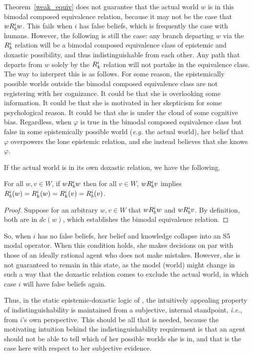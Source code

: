 Theorem~\ref{weak_equiv} does not guarantee that the actual world $w$ is in this bimodal composed equivalence relation, because it may not be the case that $wR_{b}^iw$. This fails when $i$ has false beliefs, which is frequently the case with humans. However, the following is still the case: any branch departing $w$ via the $R_{b}^i$ relation will be a bimodal composed equivalence class of epistemic and doxastic possibility, and thus indistinguishable from each other. Any path that departs from $w$ solely by the $R_{k}^i$ relation will not partake in the equivalence class. The way to interpret this is as follows. For some reason, the epistemically possible worlds outside the bimodal composed equivalence class are not registering with her cognizance. It could be that she is overlooking some information. It could be that she is motivated in her skepticism for some psychological reason. It could be that she is under the cloud of some cognitive bias. Regardless, when $\varphi$ is true in the bimodal composed equivalence class but false in some epistemically possible world (\emph{e.g.} the actual world), her belief that $\varphi$ overpowers the lone epistemic relation, and she instead believes that she knows $\varphi$.

If the actual world is in its own doxastic relation, we have the following. 

\begin{theorem}
	For all $w,v \in W$, if $wR_{b}^i w$ then for all $v \in W$, $wR_{b}^iv$ implies $R_{b}^i(w) = R_{k}^i(w) = R_{k}^i(v) = R_{b}^i(v)$.
\end{theorem}
\begin{proof}
	Suppose for an arbitrary $w,v\in W$ that $wR_{b}^iw$ and $wR_{b}^iv$. By definition, both are in $dc(w)$, which establishes the bimodal equivalence relation.
\end{proof}

So, when $i$ has no false beliefs, her belief and knowledge collapse into an S5 modal operator. When this condition holds, she makes decisions on par with those of an ideally rational agent who does not make mistakes. However, she is not guaranteed to remain in this state, as the model (world) might change in such a way that the doxastic relation comes to exclude the actual world, in which case $i$ will have false beliefs again.

Thus, in the static epistemic-doxastic logic of \DASL, the intuitively appealing property of indistinguishability is maintained from a subjective, internal standpoint, \emph{i.e.,} from $i$'s own perspective. This should be all that is needed, because the motivating intuition behind the indistinguishability requirement is that an agent should not be able to tell which of her possible worlds she is in, and that is the case here with respect to her subjective evidence.

